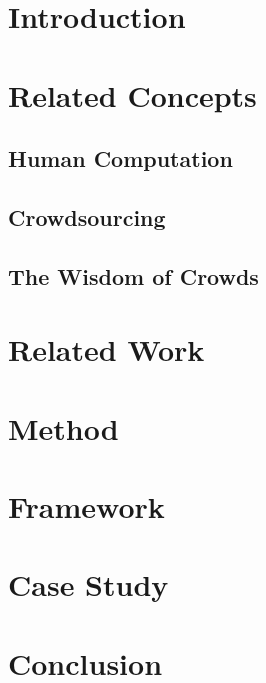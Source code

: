 \documentclass[sigconf]{acmart}
\begin{document}
\maketitle

\section{Introduction}
	

\section{Related Concepts}
	

	\subsection{Human Computation}
	

	\subsection{Crowdsourcing}
	

	\subsection{The Wisdom of Crowds}
	
	
\section{Related Work}
	

\section{Method} 
	

\section{Framework}
	


\section{Case Study}
	

\section{Conclusion}
	

\begin{acks}
	
\end{acks}


 
\end{document}

